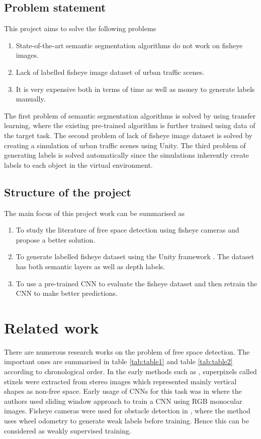 \documentclass[a4paper, 12pt, oneside, BCOR1cm,toc=chapterentrywithdots]{scrbook}
\begin{document}
\section{Problem statement}
 
This project aims to solve the following problems

\begin{enumerate}
	\item State-of-the-art semantic segmentation algorithms do not work on fisheye images.
	\item Lack of labelled fisheye image dataset of urban traffic scenes.
	\item It is very expensive both in terms of time as well as money to generate labels manually\cite{bearman2016s}.
\end{enumerate}

The first problem of semantic segmentation algorithms is solved by using transfer learning, where the existing pre-trained algorithm is further trained using data of the target task. The second problem of lack of fisheye image dataset is solved by creating a simulation of urban traffic scenes using Unity\cite{unity3d}. The third problem of generating labels is solved automatically since the simulations inherently create labels to each object in the virtual environment. 

\section{Structure of the project}
The main focus of this project work can be summarised as

\begin{enumerate}
	\item To study the literature of free space detection using fisheye cameras and propose a better solution.
	\item To generate labelled fisheye dataset using the Unity framework \cite{unity3d}. The dataset has both semantic layers as well as depth labels. 
	\item To use a pre-trained CNN to evaluate the fisheye dataset and then retrain the CNN to make better predictions.
\end{enumerate}




\chapter{Related work}

There are numerous research works on the problem of free space detection. The important ones are summarised in table \ref{tab:table1} and table \ref{tab:table2} according to chronological order. In the early methods such as \cite{badino2009stixel}, superpixels called stixels were extracted from stereo images which represented mainly vertical shapes as non-free space. Early usage of CNNs for this task was in \cite{alvarez2012road} where the authors used sliding window approach to train a CNN using RGB monocular images. Fisheye cameras were used for obstacle detection in \cite{hane2015obstacle}, where the method uses wheel odometry to generate weak labels before training. Hence this can be considered as weakly supervised training.
\end{document}
